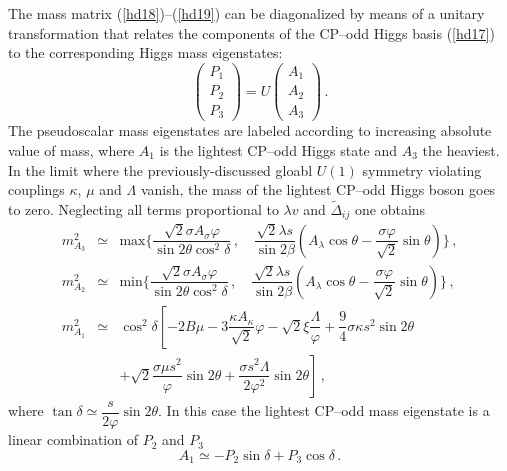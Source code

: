 \documentclass[12pt,a4paper]{article}
\newcommand{\be}{\begin{equation}}
\newcommand{\ee}{\end{equation}}
\newcommand{\ba}{\begin{array}}
\newcommand{\ea}{\end{array}}
\begin{document}
The mass matrix (\ref{hd18})--(\ref{hd19}) can be diagonalized by means of a unitary transformation that relates the components of the CP--odd
Higgs basis (\ref{hd17}) to the corresponding Higgs mass eigenstates:
\be
\left(
\begin{array}{c}
P_1\\ P_2\\ P_3
\end{array}
\right)=
U
\left(
\begin{array}{c}
A_1 \\ A_2\\ A_3
\end{array}
\right)\,.
\label{hd20}
\ee
The pseudoscalar mass eigenstates are labeled according to increasing absolute
value of mass, where $A_1$ is the lightest
CP--odd Higgs state and $A_3$ the heaviest. In the limit where the 
previously-discussed gloabl $U(1)$ symmetry violating 
couplings $\kappa$, $\mu$ and $\Lambda$ vanish, the mass of the lightest CP--odd Higgs boson goes to zero. Neglecting all terms proportional to $\lambda v$
and $\tilde{\Delta}_{ij}$ one obtains
\be
\ba{lcl}
m^2_{A_3} & \simeq & \mbox{max} \biggl\{\dfrac{\sqrt{2}\sigma A_{\sigma} \varphi}{\sin 2\theta \cos^2 \delta}\,,\quad
\dfrac{\sqrt{2}\lambda s}{\sin 2\beta}\left(A_{\lambda} \cos\theta - \dfrac{\sigma \varphi}{\sqrt{2}}\sin\theta\right) \biggr\}\,,\\[3mm]
m^2_{A_2} & \simeq & \mbox{min} \biggl\{\dfrac{\sqrt{2}\sigma A_{\sigma} \varphi}{\sin 2\theta \cos^2 \delta}\,,\quad
\dfrac{\sqrt{2}\lambda s}{\sin 2\beta}\left(A_{\lambda} \cos\theta - \dfrac{\sigma \varphi}{\sqrt{2}}\sin\theta\right)\biggr\}\,,\\[3mm]
m^2_{A_1} & \simeq & \cos^2 \delta \left[- 2 B\mu -3\dfrac{\kappa A_{\kappa}}{\sqrt{2}}\varphi
- \sqrt{2}\xi \dfrac{\Lambda}{\varphi} + \dfrac{9}{4} \sigma\kappa s^2 \sin 2\theta \right.\\[3mm]
&&\left. + \sqrt{2} \dfrac{\sigma\mu s^2}{\varphi} \sin 2\theta + \dfrac{\sigma s^2 \Lambda}{2 \varphi^2} \sin 2\theta\right]\,,
\ea
\label{hd21}
\ee
where $\tan\delta \simeq \dfrac{s}{2\varphi}\sin 2\theta$. In this case the lightest CP--odd mass eigenstate is a linear combination of
$P_2$ and $P_3$
 \be
A_1 \simeq  - P_2 \sin\delta + P_3 \cos\delta\,.
\label{hd22}
\ee
\end{document}
